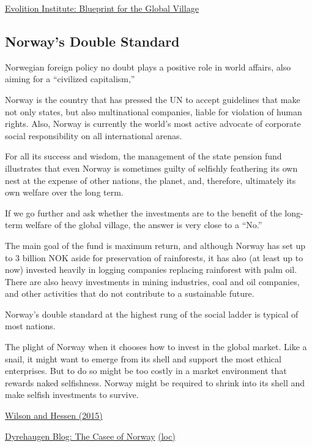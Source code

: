 \documentclass[
]{book}
\begin{document}
\href{https://thisviewoflife.com/focus-article/blueprint-for-the-global-village/}{Evolition Institute: Blueprint for the Global Village}

\hypertarget{norways-double-standard}{%
\subsection{Norway's Double Standard}\label{norways-double-standard}}

Norwegian foreign policy no doubt plays a positive role in world affairs, also aiming for a ``civilized capitalism,''

Norway is the country that has pressed the UN to accept guidelines that make not only states, but also multinational companies, liable for violation of human rights. Also, Norway is currently the world's most active advocate of corporate social responsibility on all international arenas.

For all its success and wisdom, the management of the state pension fund illustrates that even Norway is sometimes guilty of selfishly feathering its own nest at the expense of other nations, the planet, and, therefore, ultimately its own welfare over the long term.

If we go further and ask whether the investments are to the benefit of the long-term welfare of the global village, the answer is very close to a ``No.''

The main goal of the fund is maximum return, and although Norway has set up to 3 billion NOK aside for preservation of rainforests, it has also (at least up to now) invested heavily in logging companies replacing rainforest with palm oil. There are also heavy investments in mining industries, coal and oil companies, and other activities that do not contribute to a sustainable future.

Norway's double standard at the highest rung of the social ladder is typical of most nations.

The plight of Norway when it chooses how to invest in the global market. Like a snail, it might want to emerge from its shell and support the most ethical enterprises. But to do so might be too costly in a market environment that rewards naked selfishness. Norway might be required to shrink into its shell and make selfish investments to survive.

\href{https://evonomics.com/norway-toxic-trickle-down-david-sloan-wilson/}{Wilson and Hessen (2015)}

\href{https://dyrehaugen.github.io/rde/2021/02/26/the-case-of-norway/}{Dyrehaugen Blog: The Casee of Norway}
\href{http://localhost/rde/2021/02/26/the-case-of-norway/}{(loc)}
\end{document}
